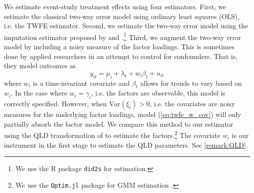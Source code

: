 \documentclass[12pt]{article}
\begin{document}
We estimate event-study treatment effects using four estimators. First, we estimate the classical two-way error model using ordinary least squares (OLS), i.e. the TWFE estimator. Second, we estimate the two-way error model using the imputation estimator proposed by \citet{Borusyak_Jaravel_Spiess_2021} and \citet{Gardner_2021}.\footnote{We use the R package \texttt{did2s} \citep{butts2022did2s} for estimation.} Third, we augment the two-way error model by including a noisy measure of the factor loadings. This is sometimes done by applied researchers in an attempt to control for confounders. That is, they model outcomes as 
\begin{equation}\label{eq:twfe_w_cov}
  y_{it} = \mu_i + \lambda_t + w_i \beta_t + u_{it}
\end{equation}
where $w_i$ is a time-invariant covariate and $\beta_t$ allows for trends to vary based on $w_i$. In the case where $w_i = \gamma_i$, i.e. the factors are observable, this model is correctly specified. However, when $\text{Var}(\xi_i) > 0$, i.e. the covariates are noisy measures for the underlying factor loadings, model (\ref{eq:twfe_w_cov}) will only partially absorb the factor model. We compare this method to our estimator using the QLD transformation of \citet{Ahn_Lee_Schmidt_2013} to estimate the factors.\footnote{We use the \texttt{Optim.jl} package for GMM estimation \citep{mogensen2018optim}.} The covariate $w_i$ is our instrument in the first stage to estimate the QLD parameters. See \autoref{remark:QLD}.
\end{document}

